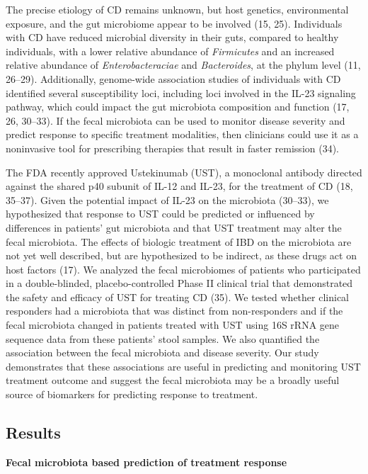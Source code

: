 \documentclass[11pt,]{article}
\begin{document}
The precise etiology of CD remains unknown, but host genetics,
environmental exposure, and the gut microbiome appear to be involved
(15, 25). Individuals with CD have reduced microbial diversity in their
guts, compared to healthy individuals, with a lower relative abundance
of \emph{Firmicutes} and an increased relative abundance of
\emph{Enterobacteraciae} and \emph{Bacteroides}, at the phylum level
(11, 26--29). Additionally, genome-wide association studies of
individuals with CD identified several susceptibility loci, including
loci involved in the IL-23 signaling pathway, which could impact the gut
microbiota composition and function (17, 26, 30--33). If the fecal
microbiota can be used to monitor disease severity and predict response
to specific treatment modalities, then clinicians could use it as a
noninvasive tool for prescribing therapies that result in faster
remission (34).

The FDA recently approved Ustekinumab (UST), a monoclonal antibody
directed against the shared p40 subunit of IL-12 and IL-23, for the
treatment of CD (18, 35--37). Given the potential impact of IL-23 on the
microbiota (30--33), we hypothesized that response to UST could be
predicted or influenced by differences in patients' gut microbiota and
that UST treatment may alter the fecal microbiota. The effects of
biologic treatment of IBD on the microbiota are not yet well described,
but are hypothesized to be indirect, as these drugs act on host factors
(17). We analyzed the fecal microbiomes of patients who participated in
a double-blinded, placebo-controlled Phase II clinical trial that
demonstrated the safety and efficacy of UST for treating CD (35). We
tested whether clinical responders had a microbiota that was distinct
from non-responders and if the fecal microbiota changed in patients
treated with UST using 16S rRNA gene sequence data from these patients'
stool samples. We also quantified the association between the fecal
microbiota and disease severity. Our study demonstrates that these
associations are useful in predicting and monitoring UST treatment
outcome and suggest the fecal microbiota may be a broadly useful source
of biomarkers for predicting response to treatment.

\subsection{Results}\label{results}

\textbf{Fecal microbiota based prediction of treatment response}
\end{document}
